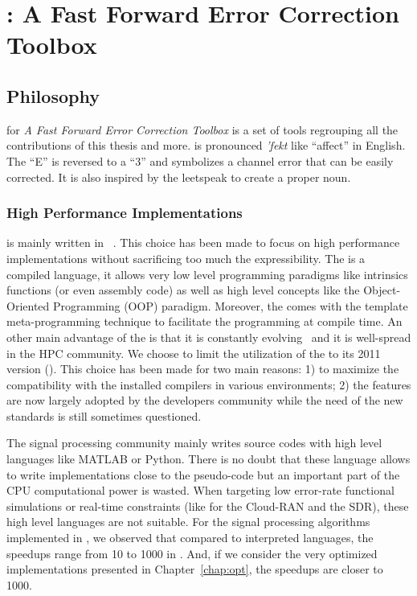 
\graphicspath{{main/chapter4/fig/}}

\chapter{\AFFECT: A Fast Forward Error Correction Toolbox}
\label{chap:aff3ct}

\vspace*{\fill}
\minitoccustom
\vspace*{\fill}

\newpage
\section{Philosophy}

\AFFECT for \emph{A Fast Forward Error Correction Toolbox} is a set of tools
regrouping all the contributions of this thesis and more. \AFFECT is pronounced
\emph{\textschwa'fekt} like ``affect'' in English. The ``E'' is reversed to a
``3'' and symbolizes a channel error that can be easily corrected. It is also
inspired by the leetspeak to create a proper noun.

\subsection{High Performance Implementations}

\AFFECT is mainly written in \Cxx~\cite{Stroustrup2013}. This choice has been
made to focus on high performance implementations without sacrificing too much
the expressibility. The \Cxx is a compiled language, it allows very low level
programming paradigms like intrinsics functions (or even assembly code) as well
as high level concepts like the Object-Oriented Programming (OOP) paradigm.
Moreover, the \Cxx comes with the template meta-programming technique to
facilitate the programming at compile time. An other main advantage of the \Cxx
is that it is constantly evolving~\cite{Stroustrup2020} and it is well-spread in
the HPC community. We choose to limit the utilization of the \Cxx to its 2011
version (). This choice has been made for two main reasons: 1) to
maximize the compatibility with the installed compilers in various environments;
2) the  features are now largely adopted by the developers community
while the need of the new \Cxx standards is still sometimes questioned.

The signal processing community mainly writes source codes with high level
languages like MATLAB or Python. There is no doubt that these language allows
to write implementations close to the pseudo-code but an important part of the
CPU computational power is wasted. When targeting low error-rate functional
simulations or real-time constraints (like for the Cloud-RAN and the SDR), these
high level languages are not suitable. For the signal processing algorithms
implemented in \AFFECT, we observed that compared to interpreted languages, the
speedups range from 10 to 1000 in \Cxx. And, if we consider the very optimized
implementations presented in Chapter~\ref{chap:opt}, the speedups are closer to
1000.


